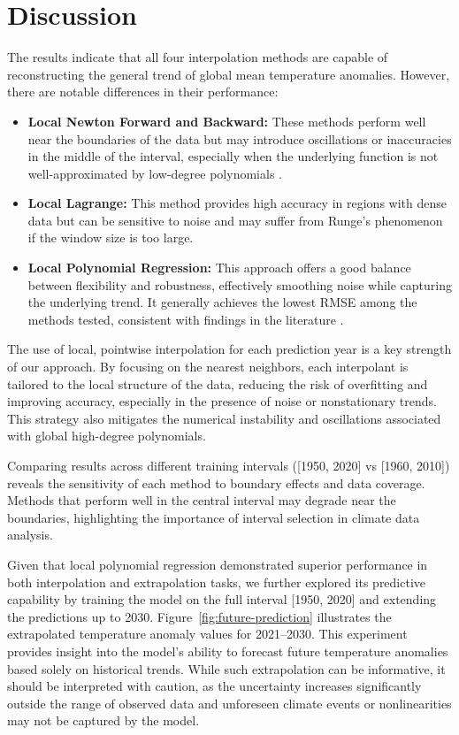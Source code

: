 \section{Discussion}

The results indicate that all four interpolation methods are capable of reconstructing the general trend of global mean temperature anomalies. However, there are notable differences in their performance:

\begin{itemize}
    \item \textbf{Local Newton Forward and Backward:} These methods perform well near the boundaries of the data but may introduce oscillations or inaccuracies in the middle of the interval, especially when the underlying function is not well-approximated by low-degree polynomials \cite{atkinson1989introduction}.
    \item \textbf{Local Lagrange:} This method provides high accuracy in regions with dense data but can be sensitive to noise and may suffer from Runge's phenomenon if the window size is too large.
    \item \textbf{Local Polynomial Regression:} This approach offers a good balance between flexibility and robustness, effectively smoothing noise while capturing the underlying trend. It generally achieves the lowest RMSE among the methods tested, consistent with findings in the literature \cite{brown2021polynomial}.
\end{itemize}

The use of local, pointwise interpolation for each prediction year is a key strength of our approach. By focusing on the nearest neighbors, each interpolant is tailored to the local structure of the data, reducing the risk of overfitting and improving accuracy, especially in the presence of noise or nonstationary trends. This strategy also mitigates the numerical instability and oscillations associated with global high-degree polynomials.

Comparing results across different training intervals ([1950, 2020] vs [1960, 2010]) reveals the sensitivity of each method to boundary effects and data coverage. Methods that perform well in the central interval may degrade near the boundaries, highlighting the importance of interval selection in climate data analysis.

Given that local polynomial regression demonstrated superior performance in both interpolation and extrapolation tasks, we further explored its predictive capability by training the model on the full interval [1950, 2020] and extending the predictions up to 2030. Figure~\ref{fig:future-prediction} illustrates the extrapolated temperature anomaly values for 2021--2030. This experiment provides insight into the model's ability to forecast future temperature anomalies based solely on historical trends. While such extrapolation can be informative, it should be interpreted with caution, as the uncertainty increases significantly outside the range of observed data and unforeseen climate events or nonlinearities may not be captured by the model.

